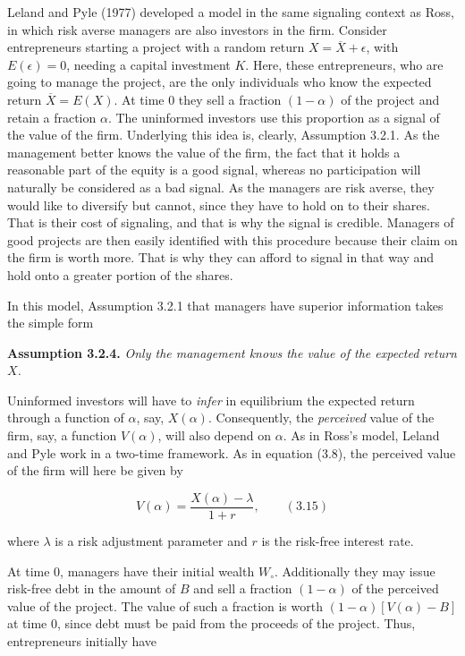 \documentclass[11pt,a4paper]{article}
\begin{document}
Leland and Pyle (1977) developed a model in the same signaling context as Ross, in which risk averse
managers are also investors in the firm. Consider entrepreneurs starting a project with a random
return \(X = \overline{X} + \epsilon\), with \(E(\epsilon) = 0\), needing a capital investment
\(K\). Here, these entrepreneurs, who are going to manage the project, are the only individuals who
know the expected return \(\overline{X} = E(X)\). At time 0 they sell a fraction \((1 - \alpha)\) of
the project and retain a fraction \(\alpha\). The uninformed investors use this proportion as a
signal of the value of the firm. Underlying this idea is, clearly, Assumption 3.2.1. As the
management better knows the value of the firm, the fact that it holds a reasonable part of the
equity is a good signal, whereas no participation will naturally be considered as a bad signal. As
the managers are risk averse, they would like to diversify but cannot, since they have to hold on to
their shares. That is their cost of signaling, and that is why the signal is credible. Managers of
good projects are then easily identified with this procedure because their claim on the firm is
worth more. That is why they can afford to signal in that way and hold onto a greater portion of the
shares.

In this model, Assumption 3.2.1 that managers have superior information takes the simple form

\textbf{Assumption 3.2.4.} \emph{Only the management knows the value of the expected return \(X\).}

Uninformed investors will have to \emph{infer} in equilibrium the expected return through a function
of \(\alpha\), say, \(X(\alpha)\). Consequently, the \emph{perceived} value of the firm, say, a
function \(V(\alpha)\), will also depend on \(\alpha\). As in Ross's model, Leland and Pyle work in
a two-time framework. As in equation (3.8), the perceived value of the firm will here be given by

\[V(\alpha) = \frac{X(\alpha) - \lambda}{1 + r}, \qquad (3.15)\]

where \(\lambda\) is a risk adjustment parameter and \(r\) is the risk-free interest rate.

At time 0, managers have their initial wealth \(W_\circ\). Additionally they may issue risk-free
debt in the amount of \(B\) and sell a fraction \((1 - \alpha)\) of the perceived value of the
project. The value of such a fraction is worth \((1 - \alpha)[V(\alpha) - B]\) at time 0, since debt
must be paid from the proceeds of the project. Thus, entrepreneurs initially have
\end{document}
